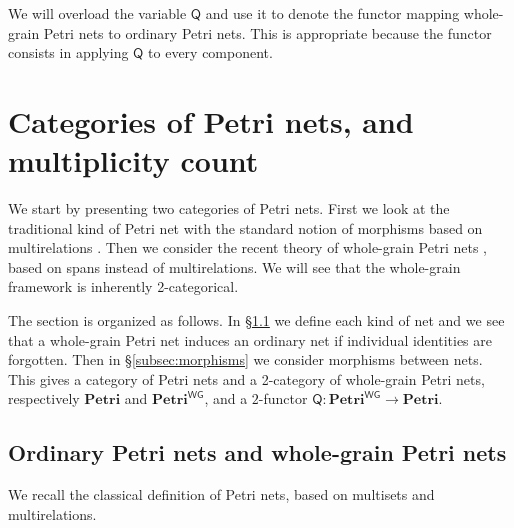 \documentclass[11pt,a4paper]{article}
\theoremstyle{plain}
\theoremstyle{definition}
\theoremstyle{remark}
\newcommand{\Petri}{\mathbf{Petri}}
\newcommand{\WGPetri}{\mathbf{Petri}^{\mathsf{WG}}}
\newcommand{\Q}{\mathsf{Q}}
\begin{document}
We will overload the variable $\Q$ and use it to denote the functor mapping
whole-grain Petri nets to ordinary Petri nets. This is appropriate because
the functor consists in applying $\Q$ to every component. 

\section{Categories of Petri nets, and multiplicity count}
\label{sec:categ-petri-nets}

We start by presenting two categories of Petri nets. First we look at the
traditional kind of Petri net with the standard notion of morphisms based on
multirelations \cite{GENUN}. Then we consider the recent theory of whole-grain
Petri nets \cite{WGPN},
based on spans instead of multirelations. We will see that the whole-grain framework is
inherently 2-categorical.

The section is organized as follows. In \S\ref{subsec:nets} we define each kind
of net and we see that a whole-grain Petri net induces an ordinary net if
individual identities are forgotten. Then in \S\ref{subsec:morphisms} we
consider morphisms between nets. This gives a category of Petri nets and a
2-category of whole-grain Petri nets, respectively $\Petri$ and $\WGPetri$, and
a $2$-functor $\Q: \WGPetri \rightarrow \Petri$.
\subsection{Ordinary Petri nets and whole-grain Petri nets}
\label{subsec:nets}

We recall the classical definition of Petri nets, based on multisets
and multirelations.
\end{document}
